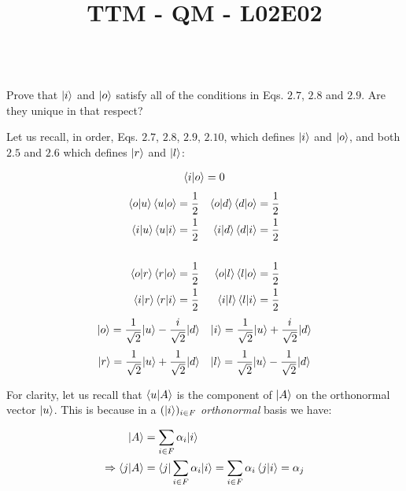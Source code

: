 \documentclass[solutions.tex]{subfiles}
\title{TTM - QM - L02E02}
\begin{document}
\maketitle
\begin{exercise}\ \\
Prove that $|i\rangle$ and $|o\rangle$ satisfy all of the
conditions in Eqs. $2.7$, $2.8$ and $2.9$. Are they unique
in that respect?
\end{exercise}
\hrr

Let us recall, in order, Eqs. $2.7$, $2.8$, $2.9$,
$2.10$, which defines $|i\rangle$ and $|o\rangle$, and both
$2.5$ and $2.6$ which defines $|r\rangle$ and $|l\rangle$:

\begin{align*}
\left\langle i \middle| o \right\rangle &= 0 \\
\end{align*}
\begin{align*}
\left\langle o \middle| u \right\rangle\left\langle u \middle| o \right\rangle &= \frac1{2} &
\left\langle o \middle| d \right\rangle\left\langle d \middle| o \right\rangle &= \frac1{2} \\
\left\langle i \middle| u \right\rangle\left\langle u \middle| i \right\rangle &= \frac1{2} &
\left\langle i \middle| d \right\rangle\left\langle d \middle| i \right\rangle &= \frac1{2} \\
~ & ~ \\
\left\langle o \middle| r \right\rangle\left\langle r \middle| o \right\rangle &= \frac1{2} &
\left\langle o \middle| l \right\rangle\left\langle l \middle| o \right\rangle &= \frac1{2} \\
\left\langle i \middle| r \right\rangle\left\langle r \middle| i \right\rangle &= \frac1{2} &
\left\langle i \middle| l \right\rangle\left\langle l \middle| i \right\rangle &= \frac1{2} \\
\end{align*}
\begin{align*}
|o\rangle &= \frac1{\sqrt2}|u\rangle - \frac{i}{\sqrt2}|d\rangle &
|i\rangle &= \frac1{\sqrt2}|u\rangle + \frac{i}{\sqrt2}|d\rangle \\
\end{align*}
\begin{align*}
|r\rangle &= \frac{1}{\sqrt2}|u\rangle + \frac{1}{\sqrt2}|d\rangle &
|l\rangle &= \frac{1}{\sqrt2}|u\rangle - \frac{1}{\sqrt2}|d\rangle \\
\end{align*}

For clarity, let us recall that $\left\langle u \middle| A \right\rangle$ is the component
of $|A\rangle$ on the orthonormal vector $|u\rangle$. This is because
in a $(|i\rangle)_{i\in F}$ \textit{orthonormal} basis we have:

\begin{align*}
|A\rangle &= \sum_{i\in F} \alpha_i|i\rangle \\
\Rightarrow \left\langle j \middle| A \right\rangle &= \langle j|\sum_{i\in F} \alpha_i|i\rangle
= \sum_{i\in F} \alpha_i\left\langle j \middle| i \right\rangle
= \alpha_j
\end{align*}
\end{document}
